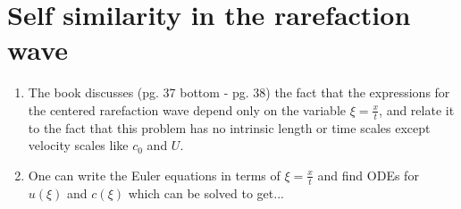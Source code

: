 ﻿\documentclass[11pt]{article}
\begin{document}
\section{Self similarity in the rarefaction wave}
\begin{enumerate}
  \item The book discusses (pg. 37 bottom - pg. 38) the fact that the expressions for the centered rarefaction wave depend only on the variable $\xi = \frac{x}{t}$, and relate it to the fact that this problem has no intrinsic length or time scales except velocity scales like $c_0$ and $U$. \item One can write the Euler equations in terms of $\xi=\frac{x}{t}$ and find ODEs for $u(\xi)$ and $c(\xi)$ which can be solved to get...
\end{enumerate}
\end{document}
